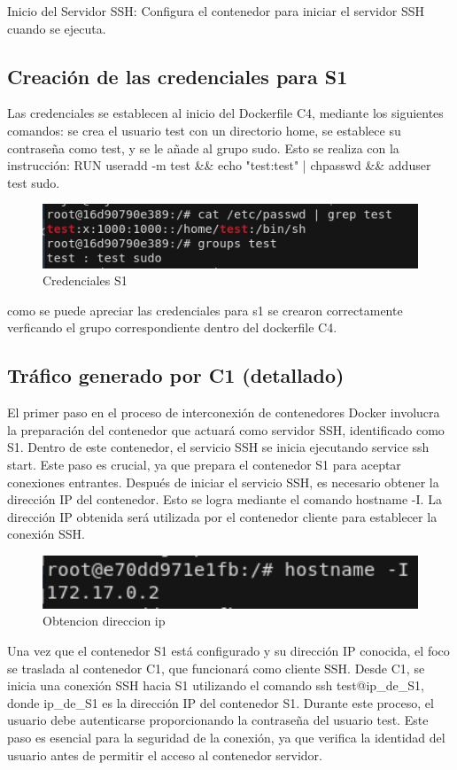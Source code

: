 \documentclass[letter,12pt]{article}
\begin{document}
Inicio del Servidor SSH: Configura el contenedor para iniciar el servidor SSH cuando se ejecuta.
\subsection{Creación de las credenciales para S1}

Las credenciales se establecen al inicio del Dockerfile C4, mediante los siguientes comandos: se crea el usuario test con un directorio home, se establece su contraseña como test, y se le añade al grupo sudo. Esto se realiza con la instrucción: RUN useradd -m test \&\& echo "test:test" | chpasswd \&\& adduser test sudo.

    \begin{figure}[H]
        \centering
        \includegraphics[width=1\textwidth]{img/credenciales_s1.png}    
        \caption{Credenciales S1}
    \end{figure}

como se puede apreciar las credenciales para s1 se crearon correctamente verficando el grupo correspondiente dentro del dockerfile C4.
\subsection{Tráfico generado por C1 (detallado)}
El primer paso en el proceso de interconexión de contenedores Docker involucra la preparación del contenedor que actuará como servidor SSH, identificado como S1. Dentro de este contenedor, el servicio SSH se inicia ejecutando service ssh start. Este paso es crucial, ya que prepara el contenedor S1 para aceptar conexiones entrantes. Después de iniciar el servicio SSH, es necesario obtener la dirección IP del contenedor. Esto se logra mediante el comando hostname -I. La dirección IP obtenida será utilizada por el contenedor cliente para establecer la conexión SSH.
    \begin{figure}[H]
        \centering
        \includegraphics[width=1\textwidth]{img/direccio_ip_s1.png}    
        \caption{Obtencion direccion ip}
    \end{figure}
Una vez que el contenedor S1 está configurado y su dirección IP conocida, el foco se traslada al contenedor C1, que funcionará como cliente SSH. Desde C1, se inicia una conexión SSH hacia S1 utilizando el comando ssh test@ip\_de\_S1, donde ip\_de\_S1 es la dirección IP del contenedor S1. Durante este proceso, el usuario debe autenticarse proporcionando la contraseña del usuario test. Este paso es esencial para la seguridad de la conexión, ya que verifica la identidad del usuario antes de permitir el acceso al contenedor servidor.
\end{document}
